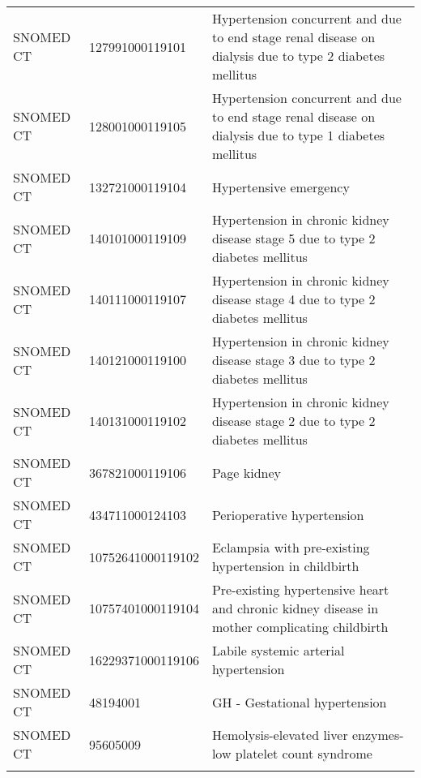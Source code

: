 \begin{longtable}{p{}p{}p{}}
  SNOMED CT & 127991000119101 & Hypertension concurrent and due to end stage renal disease on dialysis due to type 2 diabetes mellitus \\ 
  SNOMED CT & 128001000119105 & Hypertension concurrent and due to end stage renal disease on dialysis due to type 1 diabetes mellitus \\ 
  SNOMED CT & 132721000119104 & Hypertensive emergency \\ 
  SNOMED CT & 140101000119109 & Hypertension in chronic kidney disease stage 5 due to type 2 diabetes mellitus \\ 
  SNOMED CT & 140111000119107 & Hypertension in chronic kidney disease stage 4 due to type 2 diabetes mellitus \\ 
  SNOMED CT & 140121000119100 & Hypertension in chronic kidney disease stage 3 due to type 2 diabetes mellitus \\ 
  SNOMED CT & 140131000119102 & Hypertension in chronic kidney disease stage 2 due to type 2 diabetes mellitus \\ 
  SNOMED CT & 367821000119106 & Page kidney \\ 
  SNOMED CT & 434711000124103 & Perioperative hypertension \\ 
  SNOMED CT & 10752641000119102 & Eclampsia with pre-existing hypertension in childbirth \\ 
  SNOMED CT & 10757401000119104 & Pre-existing hypertensive heart and chronic kidney disease in mother complicating childbirth \\ 
  SNOMED CT & 16229371000119106 & Labile systemic arterial hypertension \\ 
  SNOMED CT & 48194001 & GH - Gestational hypertension \\ 
  SNOMED CT & 95605009 & Hemolysis-elevated liver enzymes-low platelet count syndrome \\ 
  \hline
\label{tab:codes_hypertension}
\end{longtable}
